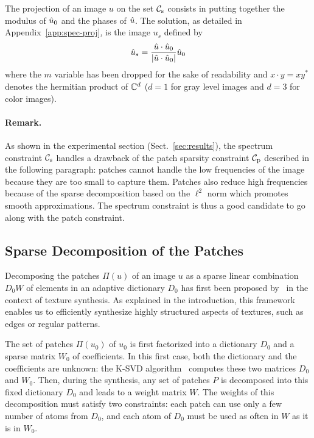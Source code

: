 The projection of an image $u$ on the set ${\mathcal{C}_{\mathrm{s}}}$ consists in putting together the modulus of $\hat{u}_0$ and the phases of $\hat{u}$.
The solution, as detailed in Appendix~\ref{app:spec-proj}, is the image $u_s$ defined by
\begin{equation}
  \label{eq:cspec-proj}
  \hat{u}_s=\frac{\hat{u}\cdot\hat{u}_0}{{\left|\hat{u}\cdot\hat{u}_0\right|}}\hat{u}_0
\end{equation}
where the $m$ variable has been dropped for the sake of readability and $x\cdot y=xy^*$ denotes the hermitian product of $\mathbb{C}^d$ ($d=1$ for gray level images and $d=3$ for color images).


\paragraph{Remark.} As shown in the experimental section (Sect.~\ref{sec:results}), the spectrum constraint ${\mathcal{C}_{\mathrm{s}}}$ handles a drawback of the patch sparsity constraint ${\mathcal{C}_{\mathrm{p}}}$ described in the following paragraph: patches cannot handle the low frequencies of the image because they are too small to capture them.
Patches also reduce high frequencies because of the sparse decomposition based on the $\ell^2$ norm which promotes smooth approximations.
The spectrum constraint is thus a good candidate to go along with the patch constraint.


\subsection{Sparse Decomposition of the Patches}
\label{sub:patch-constraint}

Decomposing the patches $\Pi(u)$ of an image $u$ as a sparse linear combination $D_0 W$ of elements in an adaptive dictionary $D_0$ has first been proposed by~\cite{peyre2009sparse} in the context of texture synthesis.
As explained in the introduction, this framework enables us to efficiently synthesize highly structured aspects of textures, such as edges or regular patterns.

The set of patches $\Pi(u_0)$ of $u_0$ is first factorized into a dictionary $D_0$ and a sparse matrix $W_0$ of coefficients.
In this first case, both the dictionary and the coefficients are unknown: the K-SVD algorithm~\cite{elad2006image} computes these two matrices $D_0$ and $W_0$.
Then, during the synthesis, any set of patches $P$ is decomposed into this fixed dictionary $D_0$ and leads to a weight matrix $W$.
The weights of this decomposition must satisfy two constraints: each patch can use only a few number of atoms from $D_0$, and each atom of $D_0$ must be used as often in $W$ as it is in $W_0$.


